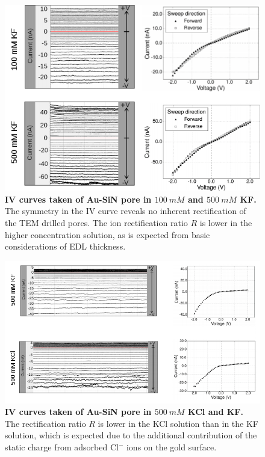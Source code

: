 		\begin{figure}
			\includegraphics[width=\textwidth]{sinau0}
			\caption{\textbf{IV curves taken of Au-SiN pore in $\SI{100}{mM}$ and $\SI{500}{mM}$ KF.} The symmetry in the IV curve reveals no inherent rectification of the TEM drilled pores. The ion rectification ratio $R$ is lower in the higher concentration solution, as is expected from basic considerations of EDL thickness.}
			\label{fig:sinau0}
		\end{figure}
		
		\begin{figure}
			\includegraphics[width=\textwidth]{sinau1}
			\caption{\textbf{IV curves taken of Au-SiN pore in $\SI{500}{mM}$ KCl and KF.} The rectification ratio $R$ is lower in the KCl solution than in the KF solution, which is expected due to the additional contribution of the static charge from adsorbed $\mathrm{Cl^{-}}$ ions on the gold surface.}
			\label{fig:sinau1}
		\end{figure}

